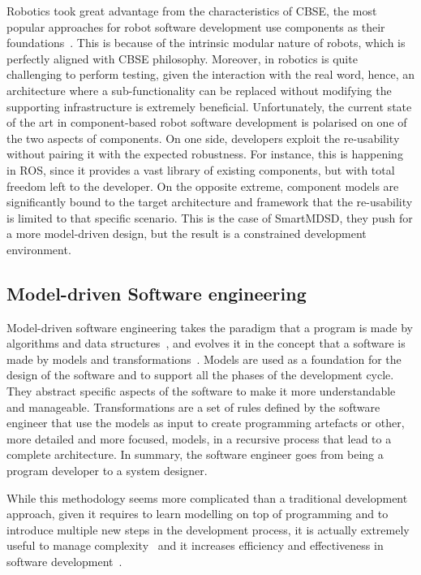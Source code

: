 Robotics took great advantage from the characteristics of CBSE, the most popular approaches for robot software development use components as their foundations~\cite{brugali2009component, brugali2010component}. This is because of the intrinsic modular nature of robots, which is perfectly aligned with CBSE philosophy. Moreover, in robotics is quite challenging to perform testing, given the interaction with the real word, hence, an architecture where a sub-functionality can be replaced without modifying the supporting infrastructure is extremely beneficial. Unfortunately, the current state of the art in component-based robot software development is polarised on one of the two aspects of components. On one side, developers exploit the re-usability without pairing it with the expected robustness. For instance, this is happening in ROS, since it provides a vast library of existing components, but with total freedom left to the developer. On the opposite extreme, component models are significantly bound to the target architecture and framework that the re-usability is limited to that specific scenario. This is the case of SmartMDSD, they push for a more model-driven design, but the result is a constrained development environment. 

\subsection{Model-driven Software engineering}
Model-driven software engineering takes the paradigm that a program is made by algorithms and data structures~\cite{wirth1986algorithms}, and evolves it in the concept that a software is made by models and transformations~\cite{brambilla2012model}. Models are used as a foundation for the design of the software and to support all the phases of the development cycle. They abstract specific aspects of the software to make it more understandable and manageable. Transformations are a set of rules defined by the software engineer that use the models as input to create programming artefacts or other, more detailed and more focused, models, in a recursive process that lead to a complete architecture. In summary, the software engineer goes from being a program developer to a system designer.

While this methodology seems more complicated than a traditional development approach, given it requires to learn modelling on top of programming and to introduce multiple new steps in the development process, it is actually extremely useful to manage complexity~\cite{selic2003pragmatics} and it increases efficiency and effectiveness in software development~\cite{acerbis2007developing}.

